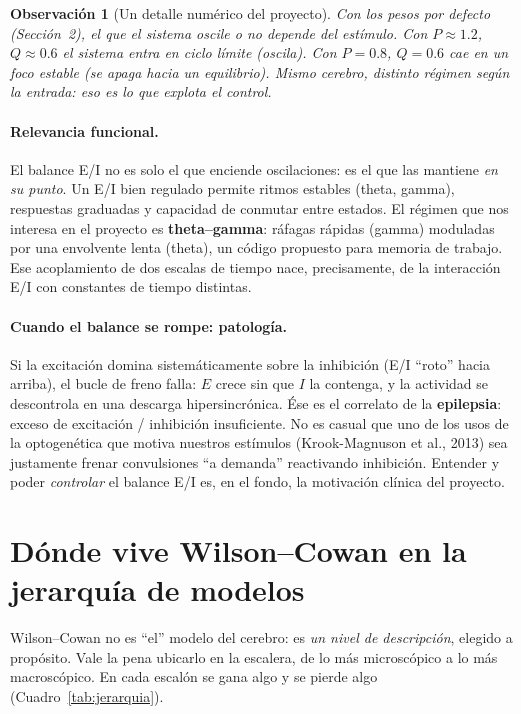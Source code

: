 \documentclass[11pt,a4paper]{article}
\newtheorem{remark}{Observación}
\begin{document}
\begin{remark}[Un detalle numérico del proyecto]
Con los pesos por defecto (Sección~2), el que el sistema oscile o no depende del estímulo. Con $P\approx 1.2$, $Q\approx 0.6$ el sistema entra en ciclo límite (oscila). Con $P=0.8$, $Q=0.6$ cae en un foco estable (se apaga hacia un equilibrio). Mismo cerebro, distinto régimen según la entrada: eso es lo que explota el control.
\end{remark}

\paragraph{Relevancia funcional.} El balance E/I no es solo el que enciende oscilaciones: es el que las mantiene \emph{en su punto}. Un E/I bien regulado permite ritmos estables (theta, gamma), respuestas graduadas y capacidad de conmutar entre estados. El régimen que nos interesa en el proyecto es \textbf{theta--gamma}: ráfagas rápidas (gamma) moduladas por una envolvente lenta (theta), un código propuesto para memoria de trabajo. Ese acoplamiento de dos escalas de tiempo nace, precisamente, de la interacción E/I con constantes de tiempo distintas.

\paragraph{Cuando el balance se rompe: patología.} Si la excitación domina sistemáticamente sobre la inhibición (E/I ``roto'' hacia arriba), el bucle de freno falla: $E$ crece sin que $I$ la contenga, y la actividad se descontrola en una descarga hipersincrónica. Ése es el correlato de la \textbf{epilepsia}: exceso de excitación / inhibición insuficiente. No es casual que uno de los usos de la optogenética que motiva nuestros estímulos (Krook-Magnuson et al., 2013) sea justamente frenar convulsiones ``a demanda'' reactivando inhibición. Entender y poder \emph{controlar} el balance E/I es, en el fondo, la motivación clínica del proyecto.


\section{Dónde vive Wilson--Cowan en la jerarquía de modelos}

Wilson--Cowan no es ``el'' modelo del cerebro: es \emph{un nivel de descripción}, elegido a propósito. Vale la pena ubicarlo en la escalera, de lo más microscópico a lo más macroscópico. En cada escalón se gana algo y se pierde algo (Cuadro~\ref{tab:jerarquia}).
\end{document}
